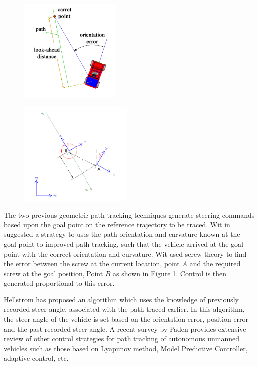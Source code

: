 \begin{figure}
	\centering
	\begin{minipage}{.5\textwidth}
		\centering
		\includegraphics[height=5cm,keepaspectratio]{Chapter2/fig/FollowTheCarrot}
		\label{fig:FollowCarrot}
	\end{minipage}%
	\begin{minipage}{.5\textwidth}
		\centering
		\includegraphics[width=1\linewidth,height=5cm,keepaspectratio]{Chapter2/fig/VectorPursuit}
		\label{fig:VectorPursuit}
	\end{minipage}
\end{figure}
The two previous geometric path tracking techniques  generate steering commands based upon the goal point on the reference trajectory to be traced. 
Wit in \cite{wit2004autonomous} suggested a strategy to uses the path orientation and curvature  known at the goal point to improved path tracking,  such that the vehicle arrived at the goal point  with the correct orientation and curvature. Wit used screw theory to find the error between the screw at the current location, point $A$  and the required screw at the goal position, Point $B $ as shown in Figure \ref{fig:VectorPursuit}. Control is then generated proportional to this error.

Hellstrom \cite{hellstrom2006follow} has proposed an algorithm which uses the knowledge of previously recorded steer angle, associated with  the path traced earlier. In this algorithm, the steer angle of the vehicle is set based on the orientation error, position error and the past recorded steer angle. A recent survey by Paden \cite{paden2016survey} provides extensive review of other control strategies for path tracking of autonomous unmanned vehicles such as those based on Lyapunov method, Model Predictive Controller, adaptive control, etc. 


